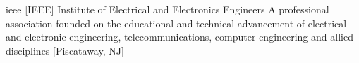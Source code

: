 \newglsXinstitution%
{ieee}%
[IEEE]%
{Institute of Electrical and Electronics Engineers}%
{A professional association founded on the educational and technical advancement of electrical and electronic engineering, telecommunications, computer engineering and allied disciplines}%
[Piscataway, NJ]%